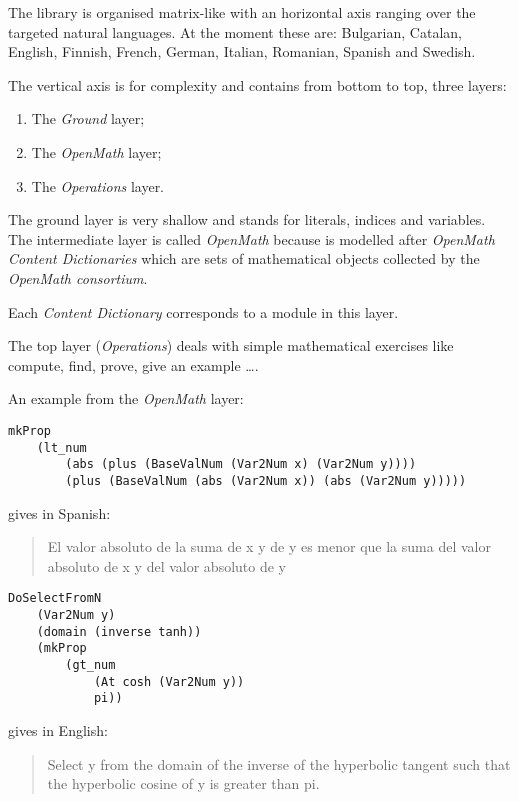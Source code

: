 \documentclass[adraft,copyright,creativecommons]{eptcs}
\begin{document}
The library is organised matrix-like with an horizontal axis ranging over the targeted natural languages.
At the moment these are: Bulgarian, Catalan, English, Finnish, French, German, Italian, Romanian, Spanish and Swedish.

The vertical axis is for complexity and contains from bottom to top, three layers:

\begin{enumerate}
	\item The \emph{Ground} layer;
	\item The \emph{OpenMath} layer;
	\item The \emph{Operations} layer.
\end{enumerate}

The ground layer is very shallow and stands for literals, indices and variables.
The intermediate layer is called \emph{OpenMath} because is modelled after \emph{OpenMath Content Dictionaries} which are sets of mathematical objects collected by the \emph{OpenMath consortium\cite{OpenMath}}.

Each \emph{Content Dictionary} corresponds to a module in this layer.

The top layer (\emph{Operations}) deals with simple mathematical exercises like compute, find, prove, give an example \ldots.

An example from the \emph{OpenMath} layer:


\begin{lstlisting}
mkProp
	(lt_num
		(abs (plus (BaseValNum (Var2Num x) (Var2Num y))))
		(plus (BaseValNum (abs (Var2Num x)) (abs (Var2Num y)))))
\end{lstlisting}
gives in Spanish:
\begin{quote}
El valor absoluto de la suma  de x y de y es menor que la suma del valor absoluto  de x y del valor absoluto de y
\end{quote}


\begin{lstlisting}
DoSelectFromN
	(Var2Num y)
	(domain (inverse tanh))
	(mkProp 
		(gt_num 
			(At cosh (Var2Num y))
			pi))	
\end{lstlisting}
gives in English:
\begin{quote}
Select y from the domain of the inverse of the hyperbolic tangent such that
the hyperbolic cosine of y is greater than pi.
\end{quote}





\nocite{*}


\end{document}
